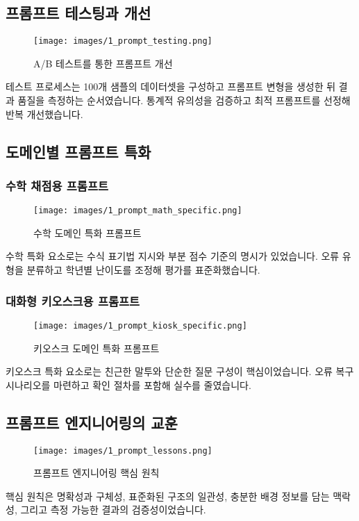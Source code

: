\subsection{프롬프트 테스팅과 개선}

\begin{figure}[H]
    \centering
    \texttt{[image: images/1\_prompt\_testing.png]}
    \caption{A/B 테스트를 통한 프롬프트 개선}
    \label{fig:prompt_testing}
\end{figure}

테스트 프로세스는 100개 샘플의 데이터셋을 구성하고 프롬프트 변형을 생성한 뒤 결과 품질을 측정하는 순서였습니다. 통계적 유의성을 검증하고 최적 프롬프트를 선정해 반복 개선했습니다.

\subsection{도메인별 프롬프트 특화}

\subsubsection{수학 채점용 프롬프트}

\begin{figure}[H]
    \centering
    \texttt{[image: images/1\_prompt\_math\_specific.png]}
    \caption{수학 도메인 특화 프롬프트}
    \label{fig:prompt_math_specific}
\end{figure}

수학 특화 요소로는 수식 표기법 지시와 부분 점수 기준의 명시가 있었습니다. 오류 유형을 분류하고 학년별 난이도를 조정해 평가를 표준화했습니다.

\subsubsection{대화형 키오스크용 프롬프트}

\begin{figure}[H]
    \centering
    \texttt{[image: images/1\_prompt\_kiosk\_specific.png]}
    \caption{키오스크 도메인 특화 프롬프트}
    \label{fig:prompt_kiosk_specific}
\end{figure}

키오스크 특화 요소로는 친근한 말투와 단순한 질문 구성이 핵심이었습니다. 오류 복구 시나리오를 마련하고 확인 절차를 포함해 실수를 줄였습니다.

\subsection{프롬프트 엔지니어링의 교훈}

\begin{figure}[H]
    \centering
    \texttt{[image: images/1\_prompt\_lessons.png]}
    \caption{프롬프트 엔지니어링 핵심 원칙}
    \label{fig:prompt_lessons}
\end{figure}

핵심 원칙은 명확성과 구체성, 표준화된 구조의 일관성, 충분한 배경 정보를 담는 맥락성, 그리고 측정 가능한 결과의 검증성이었습니다.